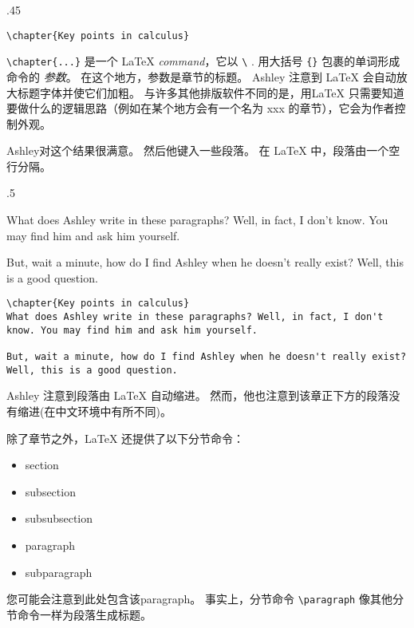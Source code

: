 \begin{miniexammar}{.45\textandmarginlen}{}
\begin{lstlisting}
\chapter{Key points in calculus}
\end{lstlisting}
\end{miniexammar}
\verb=\chapter{...}= 是一个 \LaTeX{} \emph{command}，它以 \verb=\=%
. 用大括号 \verb={}= 包裹的单词形成命令的 \emph{参数}。 在这个地方，参数是章节的标题。 Ashley 注意到 \LaTeX{} 会自动放大标题字体并使它们加粗。 与许多其他排版软件不同的是，用\LaTeX{} 只需要知道要做什么的逻辑思路（例如在某个地方会有一个名为 xxx 的章节），它会为作者控制外观。

Ashley对这个结果很满意。 然后他键入一些段落。 在 \LaTeX{} 中，段落由一个空行分隔。

\begin{miniexammar}{.5\textandmarginlen}{
%
What does Ashley write in these paragraphs? Well, in fact, I don't know. You may find him and ask him yourself.
		
\hspace{1.5em}But, wait a minute, how do I find Ashley when he doesn't really exist? Well, this is a good question.}
\begin{lstlisting}
\chapter{Key points in calculus}
What does Ashley write in these paragraphs? Well, in fact, I don't know. You may find him and ask him yourself.
		
But, wait a minute, how do I find Ashley when he doesn't really exist? Well, this is a good question.
\end{lstlisting}
\end{miniexammar}
Ashley 注意到段落由 \LaTeX{} 自动缩进。 然而，他也注意到该章正下方的段落没有缩进(在中文环境中有所不同)。

除了章节之外，\LaTeX{} 还提供了以下分节命令：
\begin{itemize}
\item section
\item subsection
\item subsubsection
\item paragraph
\item subparagraph
\end{itemize}
您可能会注意到此处包含该paragraph。 事实上，分节命令 \verb=\paragraph= 像其他分节命令一样为段落生成标题。

